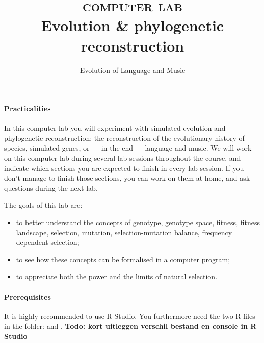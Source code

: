 \documentclass[a4paper, 9pt]{article}
\title{\textsc{computer lab}\\ \textbf{Evolution \& phylogenetic reconstruction}}
\author{Evolution of Language and Music}
\begin{document}
\maketitle


\paragraph{Practicalities}
In this computer lab you will experiment with simulated evolution and phylogenetic reconstruction: the reconstruction of the evolutionary history of species, simulated genes, or --- in the end --- language and music. 
We will work on this computer lab during several lab sessions throughout the course, and indicate which sections you are expected to finish in every lab session.
If you don't manage to finish those sections, you can work on them at home, and ask questions during the next lab.

\begin{goals}
The goals of
this lab are:
\begin{itemize}
\item to better understand the concepts of genotype, genotype space, fitness, fitness landscape, selection, mutation, selection-mutation balance, frequency dependent selection;
\item to see how these concepts can be formalised in a computer program;
\item to appreciate both the power and the limits of natural selection.
\end{itemize}
\end{goals}

\paragraph{Prerequisites}
It is highly recommended to use R Studio. You furthermore need the two R files in the  folder:  and .
\textbf{Todo: kort uitleggen verschil bestand en console in R Studio}
\end{document}
